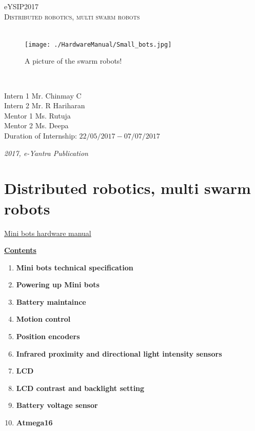 \documentclass[a4paper,12pt,oneside]{book}
\begin{document}
\begin{titlepage}
	\raggedright
	{\Large eYSIP2017\\[1cm]}
	{\Huge\scshape Distributed robotics, multi swarm robots \\[.1in]}
	\vfill
		\hfill\\
	\begin{figure}[h!]
		\caption{A picture of the swarm robots!}
		\texttt{[image: ./HardwareManual/Small\_bots.jpg]}		
	\end{figure}	
	\hfill\\
	\begin{flushright}
		{\large Intern 1 Mr. Chinmay C \\}
		{\large Intern 2 Mr. R Hariharan \\}
		{\large Mentor 1 Ms. Rutuja \\}
		{\large Mentor 2 Ms. Deepa \\}
		{\large Duration of Internship: $ 22/05/2017-07/07/2017 $ \\}
	\end{flushright}
	
	{\itshape 2017, e-Yantra Publication}
\end{titlepage}

\chapter[Project Tag]{Distributed robotics, multi swarm robots}

\begin{tabbing}
	\hspace{4cm}
	\underline{\LARGE{Mini bots hardware manual}} %
\end{tabbing}
	
	\hfill %
	
	\underline{\textbf{\Large{Contents}}}
	\begin{enumerate}
		\item{\textbf{\large{Mini bots technical specification}}}				\item{\textbf{\large{Powering up Mini bots}}}
		\item{\textbf{\large{Battery maintaince}}}
		\item{\textbf{\large{Motion control}}}
		\item{\textbf{\large{Position encoders}}}
		\item{\textbf{\large{Infrared proximity and directional light intensity sensors}}}
		\item{\textbf{\large{LCD}}}
		\item{\textbf{\large{LCD contrast and backlight setting}}}
		\item{\textbf{\large{Battery voltage sensor}}}
		\item{\textbf{\large{Atmega16}}}
	\end{enumerate}
\end{document}
